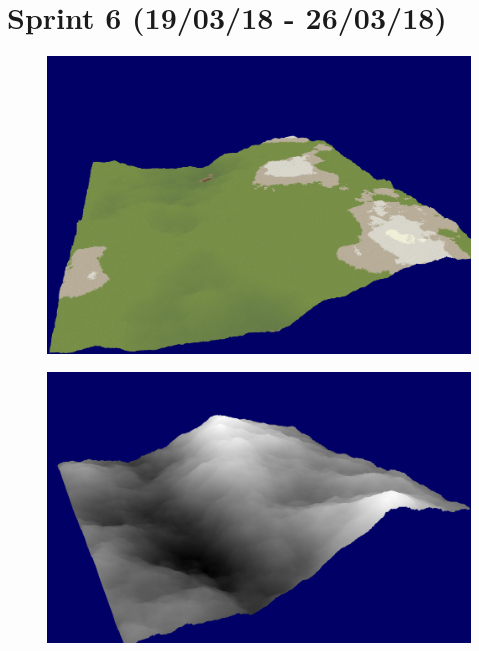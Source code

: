 \documentclass[a4paper,10pt]{report}
\begin{document}
\clearpage

\section{Sprint 6 (19/03/18 - 26/03/18)}


\begin{figure}[h!]
\centering
\begin{minipage}{.5\textwidth}
  \centering
  \includegraphics[width=.9\linewidth]{Sprint-7-After-Colour.png}
    \captionsetup{width=.9\linewidth}
  \label{fig:sprint7-c}
\end{minipage}%
\begin{minipage}{.5\textwidth}
  \centering
  \includegraphics[width=.9\linewidth]{Sprint-7-After-Greyscale.png}
    \captionsetup{width=.9\linewidth}
  \label{fig:sprint7-g}
\end{minipage}
\end{figure}
\end{document}
